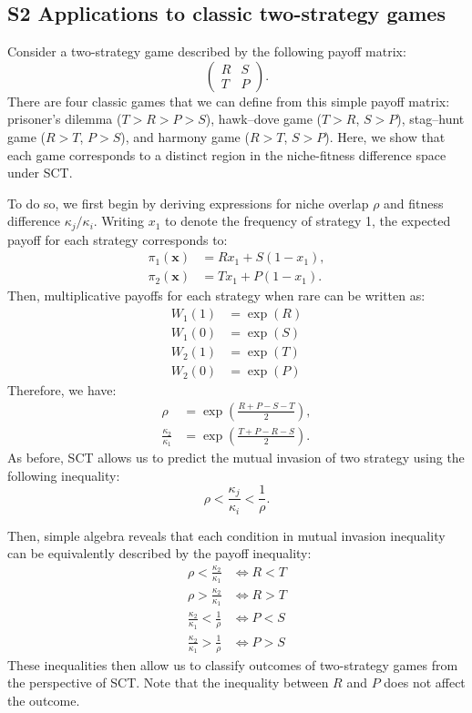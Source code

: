 \documentclass[12pt]{article}
\begin{document}
\subsection*{S2 Applications to classic two-strategy games}

Consider a two-strategy game described by the following payoff matrix:
\begin{equation}
\begin{pmatrix}
R & S \\
T & P
\end{pmatrix}.
\end{equation}
There are four classic games that we can define from this simple payoff matrix:
prisoner’s dilemma ($T>R > P>S$), hawk--dove game ($T>R$, $S>P$), stag--hunt game ($R>T$, $P>S$), and harmony game ($R>T$, $S>P$). 
Here, we show that each game corresponds to a distinct region in the niche-fitness difference space under SCT.

To do so, we first begin by deriving expressions for niche overlap $\rho$ and fitness difference $\kappa_j/\kappa_i$.
Writing $x_1$ to denote the frequency of strategy 1, the expected payoff for each strategy corresponds to:
\begin{align}
\pi_1(\mathbf{x}) &= R x_1 + S(1-x_1),\\
\pi_2(\mathbf{x}) &= T x_1 + P(1-x_1).
\end{align}
Then, multiplicative payoffs for each strategy when rare can be written as:
\begin{align}
W_1(1) &= \exp(R)\\
W_1(0) &= \exp(S)\\
W_2(1) &= \exp(T)\\
W_2(0) &= \exp(P)
\end{align}
Therefore, we have:
\begin{align}
\rho &= \exp\left(\frac{R + P - S - T}{2}\right),\\
\frac{\kappa_2}{\kappa_1} &= \exp\left(\frac{T+P-R-S}{2}\right).
\end{align}
As before, SCT allows us to predict the mutual invasion of two strategy using the following inequality:
\begin{equation}
\rho < \frac{\kappa_j}{\kappa_i} < \frac{1}{\rho}.
\end{equation}

Then, simple algebra reveals that each condition in mutual invasion inequality can be equivalently described by the payoff inequality:
\begin{align}
\rho < \frac{\kappa_2}{\kappa_1} &\iff R < T\\
\rho > \frac{\kappa_2}{\kappa_1} &\iff R > T\\
\frac{\kappa_2}{\kappa_1} < \frac{1}{\rho} &\iff P < S\\
\frac{\kappa_2}{\kappa_1} > \frac{1}{\rho} &\iff P > S
\end{align}
These inequalities then allow us to classify outcomes of two-strategy games from the perspective of SCT.
Note that the inequality between $R$ and $P$ does not affect the outcome.
\end{document}
